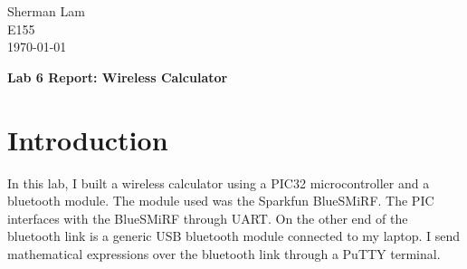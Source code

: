 \documentclass[11pt]{article}
\begin{document}
\begin{flushleft}
Sherman Lam
\\E155
\\ \today
\end{flushleft}


\begin{center}
\begin{Large}
\textbf{Lab 6 Report: Wireless Calculator}
\end{Large}
\end{center}




\section{Introduction}

In this lab, I built a wireless calculator using a PIC32 microcontroller and a bluetooth module. The module used was the Sparkfun BlueSMiRF. The PIC interfaces with the BlueSMiRF through UART. On the other end of the bluetooth link is a generic USB bluetooth module connected to my laptop. I send mathematical expressions over the bluetooth link through a PuTTY terminal.
\end{document}
